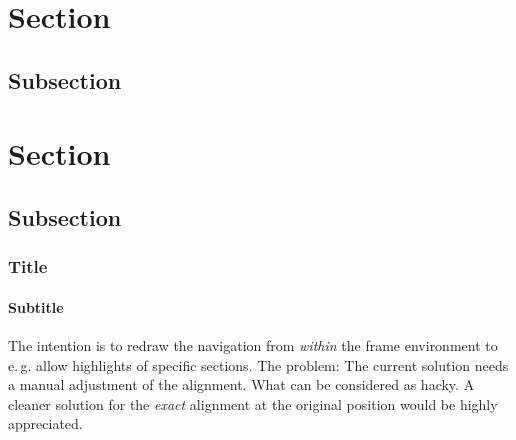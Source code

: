 \documentclass[t]{beamer}
\begin{document}
\section{Section}
\subsection{Subsection}

\section{Section}
\subsection{Subsection}

\begin{frame}[c]
\frametitle{Title}
\framesubtitle{Subtitle}
%
\begin{beamerboxesrounded}[]{}
The intention is to redraw the navigation from \emph{within} the frame environment to e.\,g. allow highlights of specific sections. The problem: The current solution needs a manual adjustment of the alignment. What can be considered as hacky. A cleaner solution for the \emph{exact} alignment at the original position would be highly appreciated.
\end{beamerboxesrounded}
\end{frame}
\end{document}

